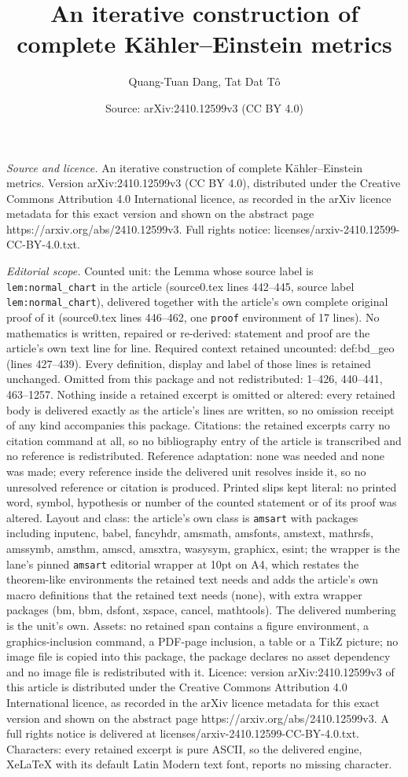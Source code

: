 \documentclass[10pt,a4paper]{amsart}
\title[An iterative construction of complete K\"ahler--Einstein met]{An iterative construction of complete K\"ahler--Einstein metrics}
\author{Quang-Tuan Dang, Tat Dat T\^o}
\date{Source: arXiv:2410.12599v3 (CC BY 4.0)}
\begin{document}
\maketitle

\noindent\emph{Source and licence.} An iterative construction of complete K\"ahler--Einstein metrics. Version arXiv:2410.12599v3 (CC BY 4.0), distributed under the Creative Commons Attribution 4.0 International licence, as recorded in the arXiv licence metadata for this exact version and shown on the abstract page https://arxiv.org/abs/2410.12599v3. Full rights notice: licenses/arxiv-2410.12599-CC-BY-4.0.txt.\par\smallskip

\noindent\textit{Editorial scope.} Counted unit: the Lemma whose source label is \texttt{lem:normal\_chart} in the article (source0.tex lines 442--445, source label \texttt{lem:normal\_chart}), delivered together with the article's own complete original proof of it (source0.tex lines 446--462, one \texttt{proof} environment of 17 lines). No mathematics is written, repaired or re-derived: statement and proof are the article's own text line for line. Required context retained uncounted: def:bd\_geo (lines 427--439). Every definition, display and label of those lines is retained unchanged. Omitted from this package and not redistributed: 1--426, 440--441, 463--1257. Nothing inside a retained excerpt is omitted or altered: every retained body is delivered exactly as the article's lines are written, so no omission receipt of any kind accompanies this package. Citations: the retained excerpts carry no citation command at all, so no bibliography entry of the article is transcribed and no reference is redistributed. Reference adaptation: none was needed and none was made; every reference inside the delivered unit resolves inside it, so no unresolved reference or citation is produced. Printed slips kept literal: no printed word, symbol, hypothesis or number of the counted statement or of its proof was altered. Layout and class: the article's own class is \texttt{amsart} with packages including inputenc, babel, fancyhdr, amsmath, amsfonts, amstext, mathrsfs, amssymb, amsthm, amscd, amsxtra, wasysym, graphicx, esint; the wrapper is the lane's pinned \texttt{amsart} editorial wrapper at 10pt on A4, which restates the theorem-like environments the retained text needs and adds the article's own macro definitions that the retained text needs (none), with extra wrapper packages (bm, bbm, dsfont, xspace, cancel, mathtools). The delivered numbering is the unit's own. Assets: no retained span contains a figure environment, a graphics-inclusion command, a PDF-page inclusion, a table or a TikZ picture; no image file is copied into this package, the package declares no asset dependency and no image file is redistributed with it. Licence: version arXiv:2410.12599v3 of this article is distributed under the Creative Commons Attribution 4.0 International licence, as recorded in the arXiv licence metadata for this exact version and shown on the abstract page https://arxiv.org/abs/2410.12599v3. A full rights notice is delivered at licenses/arxiv-2410.12599-CC-BY-4.0.txt. Characters: every retained excerpt is pure ASCII, so the delivered engine, XeLaTeX with its default Latin Modern text font, reports no missing character.
\end{document}
